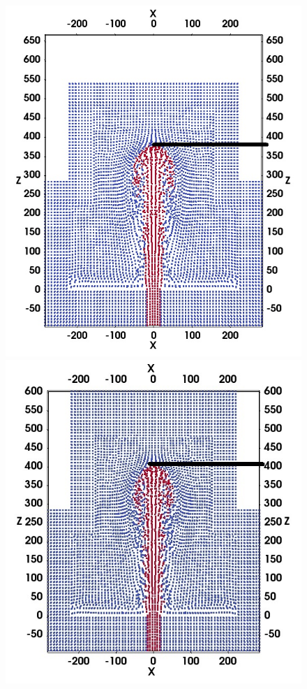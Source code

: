 \begin{figure}[H]
    \centering
    \begin{minipage}[t]{.325 \textwidth}
        \centering
        \includegraphics[width=0.99 \textwidth]{./Figures/GSPH-HLLC-t1p5-cutView}
    \end{minipage}%
    \begin{minipage}[t]{.325\textwidth}
        \centering
        \includegraphics[width=0.99 \textwidth]{./Figures/RSPH-t1p5-cutView}

\end{minipage}
\end{figure}

